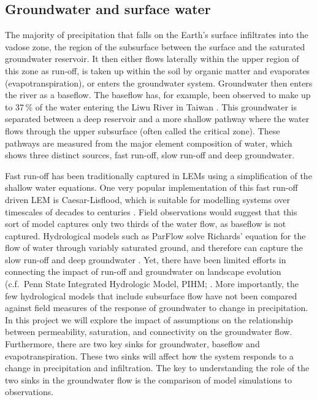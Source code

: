 \subsection{Groundwater and surface water}

The majority of precipitation that falls on the Earth’s surface infiltrates into the vadose zone, the region of the subsurface between the surface and the saturated groundwater reservoir. It then either flows laterally within the upper region of this zone as run-off, is taken up within the soil by organic matter and evaporates (evapotranspiration), or enters the groundwater system. Groundwater then enters the river as a baseflow. The baseflow has, for example, been observed to make up to 37\,\% of the water entering the Liwu River in Taiwan \citep{calmels-etal-2011}. This groundwater is separated between a deep reservoir and a more shallow pathway where the water flows through the upper subsurface (often called the critical zone). These pathways are measured from the major element composition of water, which shows three distinct sources, fast run-off, slow run-off and deep groundwater.

Fast run-off has been traditionally captured in LEMs using a simplification of the shallow water equations. One very popular implementation of this fast run-off driven LEM is Caesar-Lisflood, which is suitable for modelling systems over timescales of decades to centuries \citep{coulthard-etal-2013}. Field observations would suggest that this sort of model captures only two thirds of the water flow, as baseflow is not captured. Hydrological models such as ParFlow solve Richards' equation for the flow of water through variably saturated ground, and therefore can capture the slow run-off and deep groundwater \citep[e.g.][]{jones-2001,maxwell-etal-2015}. Yet, there have been limited efforts in connecting the impact of run-off and groundwater on landscape evolution (c.f.\ Penn State Integrated Hydrologic Model, PIHM; \citep{zhang-etal-2016}. More importantly, the few hydrological models that include subsurface flow have not been compared against field measures of the response of groundwater to change in precipitation.
In this project we will explore the impact of assumptions on the relationship between permeability, saturation, and connectivity on the groundwater flow. Furthermore, there are two key sinks for groundwater, baseflow and evapotranspiration. These two sinks will affect how the system responds to a change in precipitation and infiltration. The key to understanding the role of the two sinks in the groundwater flow is the comparison of model simulations to observations.

